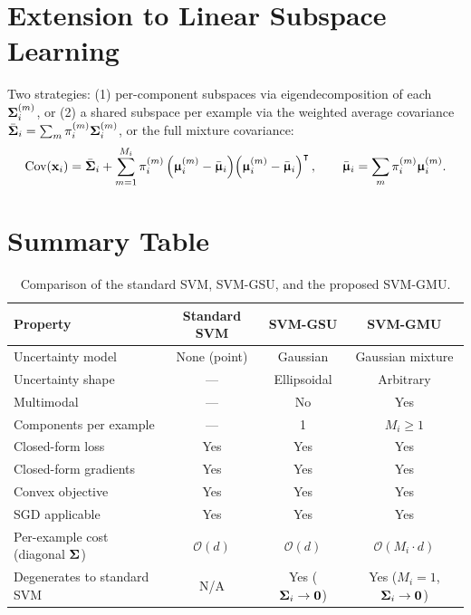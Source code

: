 \documentclass[11pt, letterpaper]{article}
\newcommand{\bSigma}{\vb{\Sigma}}
\newcommand{\bmu}{\boldsymbol{\upmu}}
\begin{document}
\section{Extension to Linear Subspace Learning}\label{sec:gmu_subspace}

Two strategies: (1) per-component subspaces via eigendecomposition of each $\bSigma_i^{(m)}$, or (2) a shared subspace per example via the weighted average covariance $\bar{\bSigma}_i = \sum_m \pi_i^{(m)} \bSigma_i^{(m)}$, or the full mixture covariance:
\begin{equation}
    \text{Cov}(\vb{x}_i) = \bar{\bSigma}_i + \sum_{m=1}^{M_i} \pi_i^{(m)}\left(\bmu_i^{(m)} - \bar{\bmu}_i\right)\!\left(\bmu_i^{(m)} - \bar{\bmu}_i\right)^{\intercal}, \qquad \bar{\bmu}_i = \sum_m \pi_i^{(m)} \bmu_i^{(m)}.
\end{equation}

\section{Summary Table}

\begin{table}[H]
\centering
\caption{Comparison of the standard SVM, SVM-GSU, and the proposed SVM-GMU.}
\label{tab:comparison}
\renewcommand{\arraystretch}{1.4}
\begin{tabular}{@{}lccc@{}}
\toprule
\textbf{Property} & \textbf{Standard SVM} & \textbf{SVM-GSU} & \textbf{SVM-GMU} \\
\midrule
Uncertainty model & None (point) & Gaussian & Gaussian mixture \\
Uncertainty shape & --- & Ellipsoidal & Arbitrary \\
Multimodal & --- & No & Yes \\
Components per example & --- & 1 & $M_i \geq 1$ \\
Closed-form loss & Yes & Yes & Yes \\
Closed-form gradients & Yes & Yes & Yes \\
Convex objective & Yes & Yes & Yes \\
SGD applicable & Yes & Yes & Yes \\
Per-example cost (diagonal $\bSigma$) & $\mathcal{O}(d)$ & $\mathcal{O}(d)$ & $\mathcal{O}(M_i \cdot d)$ \\
Degenerates to standard SVM & N/A & Yes ($\bSigma_i \to \vb{0}$) & Yes ($M_i\!=\!1$, $\bSigma_i \to \vb{0}$) \\
\bottomrule
\end{tabular}
\end{table}
\end{document}
